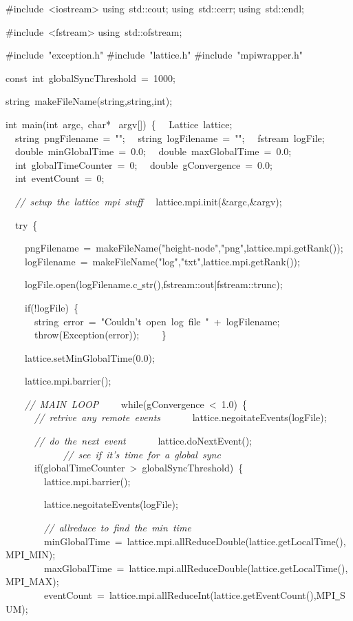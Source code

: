 {\ttfamily \raggedright \footnotesize
\#include\ <{}iostream>{}
using\ std::cout;
using\ std::cerr;
using\ std::endl;

\#include\ <{}fstream>{}
using\ std::ofstream;

\#include\ "{}exception.h"{}
\#include\ "{}lattice.h"{}
\#include\ "{}mpiwrapper.h"{}

const\ int\ globalSyncThreshold\ =\ 1000;

string\ makeFileName(string,string,int);

int\ main(int\ argc,\ char* \ argv[])\ \{
\ \ Lattice\ lattice;
\ \ string\ pngFilename\ =\ "{}"{};
\ \ string\ logFilename\ =\ "{}"{};
\ \ fstream\ logFile;
\ \ double\ minGlobalTime\ =\ 0.0;
\ \ double\ maxGlobalTime\ =\ 0.0;
\ \ int\ globalTimeCounter\ =\ 0;
\ \ double\ gConvergence\ =\ 0.0;
\ \ int\ eventCount\ =\ 0;

\ \ \textsl{//\ setup\ the\ lattice\ mpi\ stuff}
\ \ lattice.mpi.init(\&argc,\&argv);

\ \ try\ \{

\ \ \ \ pngFilename\ =\ makeFileName("{}height-{}node"{},"{}png"{},lattice.mpi.getRank());
\ \ \ \ logFilename\ =\ makeFileName("{}log"{},"{}txt"{},lattice.mpi.getRank());

\ \ \ \ logFile.open(logFilename.c\underline\ str(),fstream::out|fstream::trunc);

\ \ \ \ if(!logFile)\ \{
\ \ \ \ \ \ string\ error\ =\ "{}Couldn't\ open\ log\ file\ "{}\ +\ logFilename;
\ \ \ \ \ \ throw(Exception(error));
\ \ \ \ \}

\ \ \ \ lattice.setMinGlobalTime(0.0);

\ \ \ \ lattice.mpi.barrier();

\ \ \ \ \textsl{//\ MAIN\ LOOP}
\ \ \ \ while(gConvergence\ <{}\ 1.0)\ \{
\ \ \ \ \ \ \textsl{//\ retrive\ any\ remote\ events}
\ \ \ \ \ \ lattice.negoitateEvents(logFile);

\ \ \ \ \ \ \textsl{//\ do\ the\ next\ event}
\ \ \ \ \ \ lattice.doNextEvent();
\ \ \ \ \ \
\ \ \ \ \ \ \textsl{//\ see\ if\ it's\ time\ for\ a\ global\ sync}
\ \ \ \ \ \ if(globalTimeCounter\ >{}\ globalSyncThreshold)\ \{
\ \ \ \ \ \ \ \ lattice.mpi.barrier();

\ \ \ \ \ \ \ \ lattice.negoitateEvents(logFile);

\ \ \ \ \ \ \ \ \textsl{//\ allreduce\ to\ find\ the\ min\ time}
\ \ \ \ \ \ \ \ minGlobalTime\ =\ lattice.mpi.allReduceDouble(lattice.getLocalTime(),MPI\underline\ MIN);
\ \ \ \ \ \ \ \ maxGlobalTime\ =\ lattice.mpi.allReduceDouble(lattice.getLocalTime(),MPI\underline\ MAX);
\ \ \ \ \ \ \ \ eventCount\ =\ lattice.mpi.allReduceInt(lattice.getEventCount(),MPI\underline\ SUM);

}
